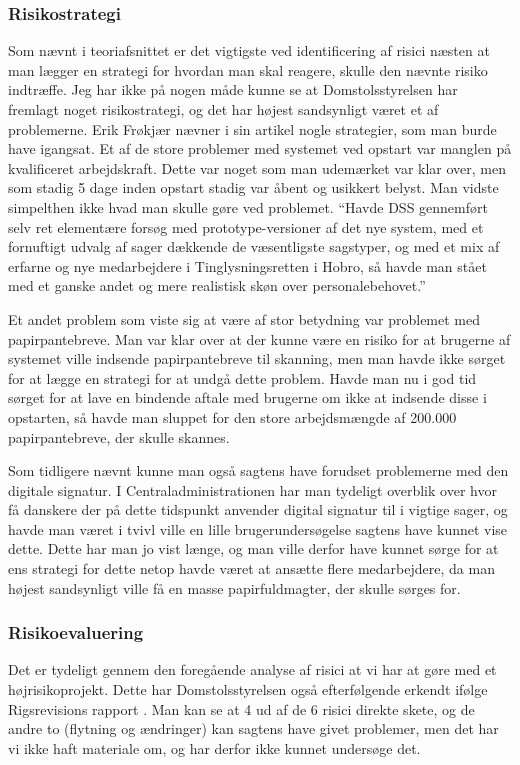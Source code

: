 \documentclass[10pt,a4paper,danish]{article}
\begin{document}
\subsubsection{Risikostrategi}
Som nævnt i teoriafsnittet er det vigtigste ved identificering af risici næsten at man lægger en strategi for hvordan man skal reagere, skulle den nævnte risiko indtræffe. Jeg har ikke på nogen måde kunne se at Domstolsstyrelsen har fremlagt noget risikostrategi, og det har højest sandsynligt været et af problemerne. Erik Frøkjær nævner i sin artikel \cite{Erik} nogle strategier, som man burde have igangsat. Et af de store problemer med systemet ved opstart var manglen på kvalificeret arbejdskraft. Dette var noget som man udemærket var klar over, men som stadig 5 dage inden opstart stadig var åbent og usikkert belyst. Man vidste simpelthen ikke hvad man skulle gøre ved problemet. "`Havde DSS gennemført selv ret elementære forsøg med prototype-versioner af det nye system, med et fornuftigt udvalg af sager dækkende de væsentligste sagstyper, og med et mix af erfarne og nye medarbejdere i Tinglysningsretten i Hobro, så havde man stået med et ganske andet og mere realistisk skøn over personalebehovet."' 

Et andet problem som viste sig at være af stor betydning var problemet med papirpantebreve. Man var klar over at der kunne være en risiko for at brugerne af systemet ville indsende papirpantebreve til skanning, men man havde ikke sørget for at lægge en strategi for at undgå dette problem. Havde man nu i god tid sørget for at lave en bindende aftale med brugerne om ikke at indsende disse i opstarten, så havde man sluppet for den store arbejdsmængde af 200.000 papirpantebreve, der skulle skannes. 

Som tidligere nævnt kunne man også sagtens have forudset problemerne med den digitale signatur. I Centraladministrationen har man tydeligt overblik over hvor få danskere der på dette tidspunkt anvender digital signatur til i vigtige sager, og havde man været i tvivl ville en lille brugerundersøgelse sagtens have kunnet vise dette. Dette har man jo vist længe, og man ville derfor have kunnet sørge for at ens strategi for dette netop havde været at ansætte flere medarbejdere, da man højest sandsynligt ville få en masse papirfuldmagter, der skulle sørges for.


\subsubsection{Risikoevaluering}
Det er tydeligt gennem den foregående analyse af risici at vi har at gøre med et højrisikoprojekt. Dette har Domstolsstyrelsen også efterfølgende erkendt ifølge Rigsrevisions rapport \cite{Rigs}. Man kan se at 4 ud af de 6 risici direkte skete, og de andre to (flytning og ændringer) kan sagtens have givet problemer, men det har vi ikke haft materiale om, og har derfor ikke kunnet undersøge det.
\end{document}
